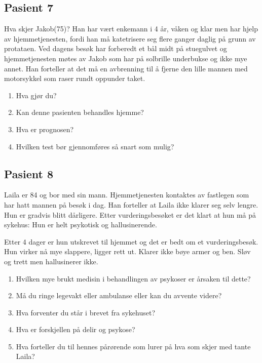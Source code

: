 			\subsection{Pasient 7}
				Hva skjer Jakob(75)? Han har vært enkemann i 4 år, våken og klar men har hjelp av hjemmetjenesten, fordi han må katetrisere seg flere ganger daglig på grunn av protataen. Ved dagens besøk har forberedt et bål midt på stuegulvet og hjemmetjenesten møtes av Jakob som har på solbrille underbukse og ikke mye annet. Han forteller at det må en avbrenning til å fjerne den lille mannen med motorsykkel som raser rundt oppunder taket. 
				\begin{enumerate}
					\item Hva gjør du?
					\item Kan denne pasienten behandles hjemme?
					\item Hva er prognosen?
					\item Hvilken test bør gjennomføres så snart som mulig?
				\end{enumerate}
			\subsection{Pasient 8}
				Laila er 84 og bor med sin mann. Hjemmetjenesten kontaktes av fastlegen som har hatt mannen på besøk i dag. Han forteller at Laila ikke klarer seg selv lengre. Hun er gradvis blitt dårligere. Etter vurderingsbesøket er det klart at hun må på sykehus: Hun er helt psykotisk og hallusinerende.\par
				Etter 4 dager er hun utskrevet til hjemmet og det er bedt om et vurderingsbesøk. Hun virker nå mye slappere, ligger rett ut. Klarer ikke bøye armer og ben. Sløv og trett men hallusinerer ikke.
				\begin{enumerate}
						\item Hvilken mye brukt medisin i behandlingen av psykoser er årsaken til dette?
						\item Må du ringe legevakt eller ambulanse eller kan du avvente videre?
						\item Hva forventer du står i brevet fra sykehuset?
						\item Hva er forskjellen på delir og psykose? 
						\item Hva forteller du til hennes pårørende som lurer på hva som skjer med tante Laila?
					\end{enumerate}